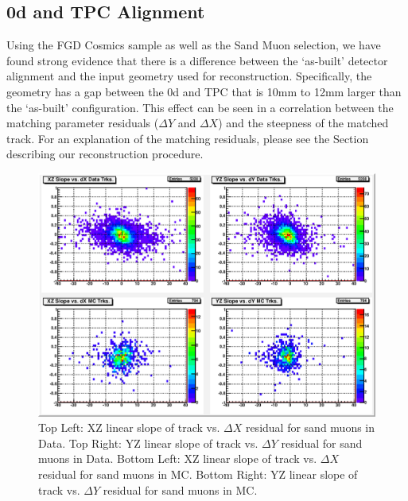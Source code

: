 \subsection{\p0d and TPC Alignment}
\label{sec:Appendix_align}

Using the FGD Cosmics sample as well as the Sand Muon selection, we have found strong evidence that there is a difference between the `as-built' detector alignment and the input geometry used for reconstruction. Specifically, the geometry has a gap between the \p0d and TPC that is 10mm to 12mm larger than the `as-built' configuration. This effect can be seen in a correlation between the matching parameter residuals ($\Delta Y$ and $\Delta X$) and the steepness of the matched track. For an explanation of the matching residuals, please see the Section describing our reconstruction procedure. 

\begin{figure}
  \centering
  \includegraphics[width=6in]{Figures/Appendix/cdy_SM.eps}
  \caption{Top Left: XZ linear slope of track vs. $\Delta X$ residual for sand muons in Data. Top Right: YZ linear slope of track vs. $\Delta Y$ residual for sand muons in Data. Bottom Left: XZ linear slope of track vs. $\Delta X$ residual for sand muons in MC. Bottom Right: YZ linear slope of track vs. $\Delta Y$ residual for sand muons in MC.} 
  \label{fig:cdy_SM}%
\end{figure}

